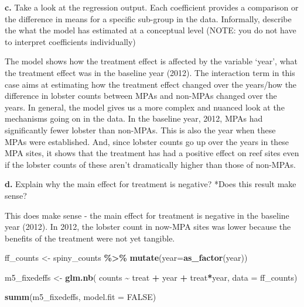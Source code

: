 \documentclass[
]{article}
\newenvironment{Shaded}{\begin{snugshade}}{\end{snugshade}}
\newcommand{\AttributeTok}[1]{\textcolor[rgb]{0.13,0.29,0.53}{#1}}
\newcommand{\ConstantTok}[1]{\textcolor[rgb]{0.56,0.35,0.01}{#1}}
\newcommand{\FunctionTok}[1]{\textcolor[rgb]{0.13,0.29,0.53}{\textbf{#1}}}
\newcommand{\NormalTok}[1]{#1}
\newcommand{\OtherTok}[1]{\textcolor[rgb]{0.56,0.35,0.01}{#1}}
\newcommand{\SpecialCharTok}[1]{\textcolor[rgb]{0.81,0.36,0.00}{\textbf{#1}}}
\begin{document}
\textbf{c.} Take a look at the regression output. Each coefficient
provides a comparison or the difference in means for a specific
sub-group in the data. Informally, describe the what the model has
estimated at a conceptual level (NOTE: you do not have to interpret
coefficients individually)

The model shows how the treatment effect is affected by the variable
`year', what the treatment effect was in the baseline year (2012). The
interaction term in this case aims at estimating how the treatment
effect changed over the years/how the difference in lobster counts
between MPAs and non-MPAs changed over the years. In general, the model
gives us a more complex and nuanced look at the mechanisms going on in
the data. In the baseline year, 2012, MPAs had significantly fewer
lobster than non-MPAs. This is also the year when these MPAs were
established. And, since lobster counts go up over the years in these MPA
sites, it shows that the treatment has had a positive effect on reef
sites even if the lobster counts of these aren't dramatically higher
than those of non-MPAs.

\textbf{d.} Explain why the main effect for treatment is negative? *Does
this result make sense?

This does make sense - the main effect for treatment is negative in the
baseline year (2012). In 2012, the lobster count in now-MPA sites was
lower because the benefits of the treatment were not yet tangible.

\begin{Shaded}
\begin{Highlighting}[]
\NormalTok{ff\_counts }\OtherTok{\textless{}{-}}\NormalTok{ spiny\_counts }\SpecialCharTok{\%\textgreater{}\%}
    \FunctionTok{mutate}\NormalTok{(}\AttributeTok{year=}\FunctionTok{as\_factor}\NormalTok{(year))}

\NormalTok{m5\_fixedeffs }\OtherTok{\textless{}{-}} \FunctionTok{glm.nb}\NormalTok{(}
\NormalTok{    counts }\SpecialCharTok{\textasciitilde{}}
\NormalTok{        treat }\SpecialCharTok{+}
\NormalTok{        year }\SpecialCharTok{+}
\NormalTok{        treat}\SpecialCharTok{*}\NormalTok{year,}
    \AttributeTok{data =}\NormalTok{ ff\_counts)}

\FunctionTok{summ}\NormalTok{(m5\_fixedeffs, }\AttributeTok{model.fit =} \ConstantTok{FALSE}\NormalTok{)}
\end{Highlighting}
\end{Shaded}
\end{document}
